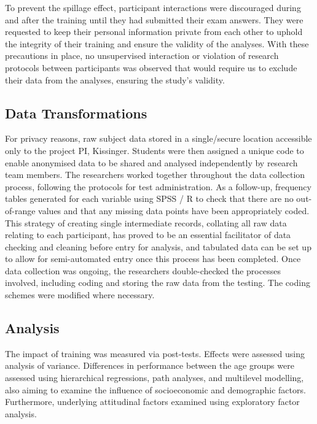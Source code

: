 To prevent the spillage  effect, participant interactions were discouraged during and after the training until they had submitted their exam answers. They were requested to keep their personal information private from each other to uphold the integrity of their training and ensure the validity of the analyses. With these precautions in place, no  unsupervised interaction or violation of research protocols between participants was observed  that would require us to exclude their data from the analyses, ensuring the study's validity. 

\subsection{Data Transformations}

For privacy reasons, raw subject data stored in a single/secure location accessible only to the project PI, Kissinger.
Students were then assigned a unique code to enable anonymised data to be shared and analysed independently by research team members. 
The researchers worked together throughout the data collection process, following the protocols for test administration. 
As a follow-up, frequency tables generated for each variable using SPSS / R to check that there are no out-of-range values and that any missing data points have been appropriately coded.
This strategy of creating single intermediate records, collating all raw data relating to each participant, has proved to be an essential facilitator of data checking and cleaning before entry for analysis, and tabulated data can be set up to allow for semi-automated entry once this process has been completed. 
Once data collection was ongoing, the researchers double-checked the processes involved, including coding and storing the raw data from the testing.
The coding schemes were modified where necessary.

\subsection{Analysis}

The impact of training was measured via post-tests.
Effects were assessed using analysis of variance. Differences in performance between the age groups were assessed using hierarchical regressions, path analyses, and multilevel modelling, also aiming to examine the influence of socioeconomic and demographic factors. 
Furthermore, underlying attitudinal factors examined using exploratory factor analysis. 

